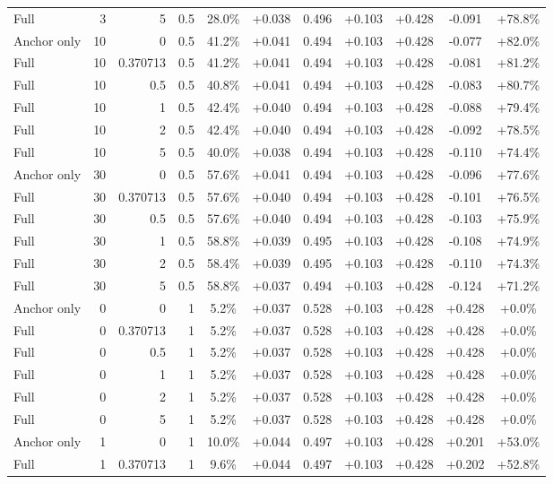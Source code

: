 \begin{table}[htbp]
\begin{tabular}{lrrrccccccc}
Full & 3 & 5 & 0.5 & 28.0\% & +0.038 & 0.496 & +0.103 & +0.428 & -0.091 & +78.8\% \\
Anchor only & 10 & 0 & 0.5 & 41.2\% & +0.041 & 0.494 & +0.103 & +0.428 & -0.077 & +82.0\% \\
Full & 10 & 0.370713 & 0.5 & 41.2\% & +0.041 & 0.494 & +0.103 & +0.428 & -0.081 & +81.2\% \\
Full & 10 & 0.5 & 0.5 & 40.8\% & +0.041 & 0.494 & +0.103 & +0.428 & -0.083 & +80.7\% \\
Full & 10 & 1 & 0.5 & 42.4\% & +0.040 & 0.494 & +0.103 & +0.428 & -0.088 & +79.4\% \\
Full & 10 & 2 & 0.5 & 42.4\% & +0.040 & 0.494 & +0.103 & +0.428 & -0.092 & +78.5\% \\
Full & 10 & 5 & 0.5 & 40.0\% & +0.038 & 0.494 & +0.103 & +0.428 & -0.110 & +74.4\% \\
Anchor only & 30 & 0 & 0.5 & 57.6\% & +0.041 & 0.494 & +0.103 & +0.428 & -0.096 & +77.6\% \\
Full & 30 & 0.370713 & 0.5 & 57.6\% & +0.040 & 0.494 & +0.103 & +0.428 & -0.101 & +76.5\% \\
Full & 30 & 0.5 & 0.5 & 57.6\% & +0.040 & 0.494 & +0.103 & +0.428 & -0.103 & +75.9\% \\
Full & 30 & 1 & 0.5 & 58.8\% & +0.039 & 0.495 & +0.103 & +0.428 & -0.108 & +74.9\% \\
Full & 30 & 2 & 0.5 & 58.4\% & +0.039 & 0.495 & +0.103 & +0.428 & -0.110 & +74.3\% \\
Full & 30 & 5 & 0.5 & 58.8\% & +0.037 & 0.494 & +0.103 & +0.428 & -0.124 & +71.2\% \\
Anchor only & 0 & 0 & 1 & 5.2\% & +0.037 & 0.528 & +0.103 & +0.428 & +0.428 & +0.0\% \\
Full & 0 & 0.370713 & 1 & 5.2\% & +0.037 & 0.528 & +0.103 & +0.428 & +0.428 & +0.0\% \\
Full & 0 & 0.5 & 1 & 5.2\% & +0.037 & 0.528 & +0.103 & +0.428 & +0.428 & +0.0\% \\
Full & 0 & 1 & 1 & 5.2\% & +0.037 & 0.528 & +0.103 & +0.428 & +0.428 & +0.0\% \\
Full & 0 & 2 & 1 & 5.2\% & +0.037 & 0.528 & +0.103 & +0.428 & +0.428 & +0.0\% \\
Full & 0 & 5 & 1 & 5.2\% & +0.037 & 0.528 & +0.103 & +0.428 & +0.428 & +0.0\% \\
Anchor only & 1 & 0 & 1 & 10.0\% & +0.044 & 0.497 & +0.103 & +0.428 & +0.201 & +53.0\% \\
Full & 1 & 0.370713 & 1 & 9.6\% & +0.044 & 0.497 & +0.103 & +0.428 & +0.202 & +52.8\% \\

\end{tabular}
\end{table}
